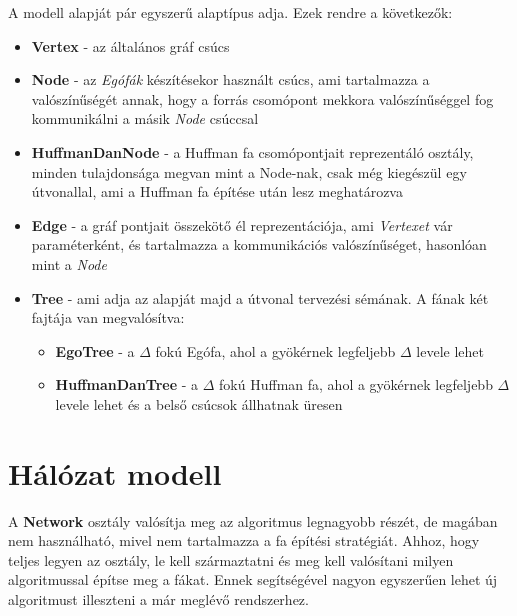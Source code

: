 \documentclass[12pt]{report}
\begin{document}
A modell alapját pár egyszerű alaptípus adja. Ezek rendre a következők:
\begin{itemize}
	\item \textbf{Vertex} - az általános gráf csúcs
	\item \textbf{Node} - az \textit{Egófák} készítésekor használt csúcs, ami tartalmazza a valószínűségét annak, hogy a forrás csomópont mekkora valószínűséggel fog kommunikálni a másik \textit{Node} csúccsal
	\item \textbf{HuffmanDanNode} - a Huffman fa csomópontjait reprezentáló osztály, minden tulajdonsága megvan mint a Node-nak, csak még kiegészül egy útvonallal, ami a Huffman fa építése után lesz meghatározva
	\item \textbf{Edge} - a gráf pontjait összekötő él reprezentációja, ami \textit{Vertexet} vár paraméterként, és tartalmazza a kommunikációs valószínűséget, hasonlóan mint a \textit{Node}
	\item \textbf{Tree} - ami adja az alapját majd a útvonal tervezési sémának. A fának két fajtája van megvalósítva:
	\begin{itemize}
		\item \textbf{EgoTree} - a $\Delta$ fokú Egófa, ahol a gyökérnek legfeljebb $\Delta$ levele lehet
		\item \textbf{HuffmanDanTree} - a $\Delta$ fokú Huffman fa, ahol a gyökérnek legfeljebb $\Delta$ levele lehet és a belső csúcsok állhatnak üresen
	\end{itemize}
	
	
\end{itemize}

\section{Hálózat modell}

A \textbf{Network} osztály valósítja meg az algoritmus legnagyobb részét, de magában nem használható, mivel nem tartalmazza a fa építési stratégiát.
Ahhoz, hogy teljes legyen az osztály, le kell származtatni és meg kell valósítani milyen algoritmussal építse meg a fákat.
Ennek segítségével nagyon egyszerűen lehet új algoritmust illeszteni a már meglévő rendszerhez.
\end{document}
